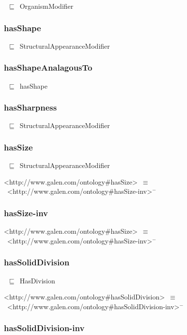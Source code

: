 \documentclass{article}
\begin{document}
~\ensuremath{\sqsubseteq}~OrganismModifier

\subsubsection*{hasShape}

~\ensuremath{\sqsubseteq}~StructuralAppearanceModifier

\subsubsection*{hasShapeAnalagousTo}

~\ensuremath{\sqsubseteq}~hasShape

\subsubsection*{hasSharpness}

~\ensuremath{\sqsubseteq}~StructuralAppearanceModifier

\subsubsection*{hasSize}

~\ensuremath{\sqsubseteq}~StructuralAppearanceModifier

<http://www.galen.com/ontology#hasSize>~\ensuremath{\equiv}~<http://www.galen.com/ontology#hasSize-inv>\ensuremath{^-}

\subsubsection*{hasSize-inv}

<http://www.galen.com/ontology#hasSize>~\ensuremath{\equiv}~<http://www.galen.com/ontology#hasSize-inv>\ensuremath{^-}

\subsubsection*{hasSolidDivision}

~\ensuremath{\sqsubseteq}~HasDivision

<http://www.galen.com/ontology#hasSolidDivision>~\ensuremath{\equiv}~<http://www.galen.com/ontology#hasSolidDivision-inv>\ensuremath{^-}

\subsubsection*{hasSolidDivision-inv}
\end{document}
